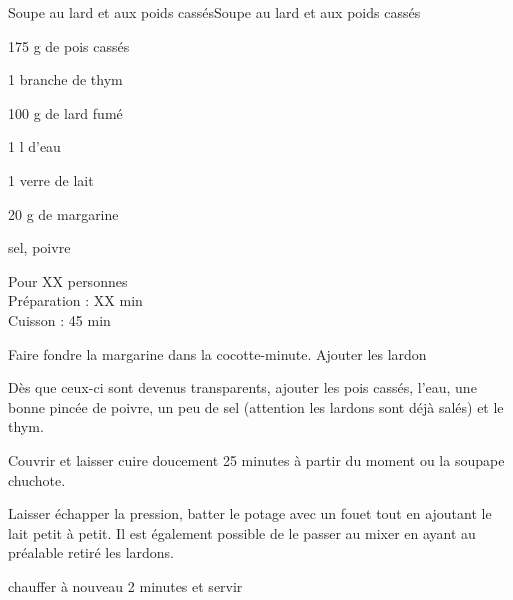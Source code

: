 \begin{recette}{Soupe au lard et aux poids cassés}{Soupe au lard et aux poids cassés}

\begin{ingredients}
175 g de pois cassés\par
1 branche de thym\par
100 g de lard fumé\par
1 l d'eau\par
1 verre de lait\par
20 g de margarine\par
sel, poivre\par
\end{ingredients}

\begin{infos}
Pour XX personnes\\
Préparation : XX min\\
Cuisson : 45 min\\
\end{infos}

\begin{etapes}
\item Faire fondre la margarine dans la cocotte-minute. Ajouter les lardon
\item Dès que ceux-ci sont devenus transparents, ajouter les pois cassés, l'eau, une bonne pincée de poivre, un peu de sel (attention les lardons sont déjà salés) et le thym.
\item Couvrir et laisser cuire doucement 25 minutes à partir du moment ou la soupape chuchote.
\item Laisser échapper la pression, batter le potage avec un fouet tout en ajoutant le lait petit à petit. Il est également possible de le passer au mixer en ayant au préalable retiré les lardons.
\item chauffer à nouveau 2 minutes et servir
\end{etapes}

\end{recette}